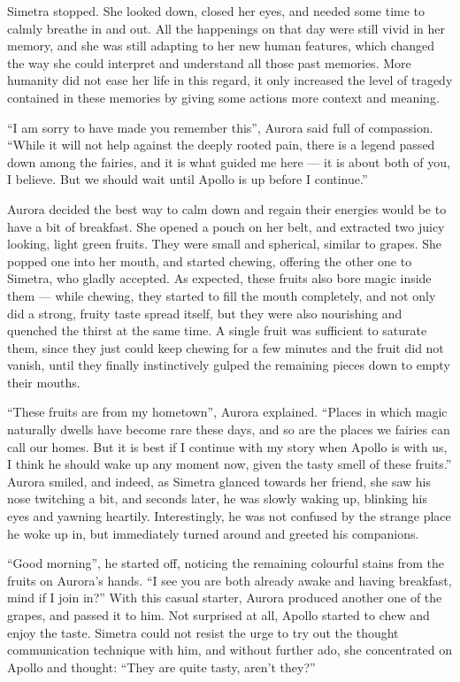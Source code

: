 Simetra stopped. She looked down, closed her eyes, and needed some time to calmly breathe in and out. All the happenings on that day were still vivid in her memory, and she was still adapting to her new human features, which changed the way she could interpret and understand all those past memories. More humanity did not ease her life in this regard, it only increased the level of tragedy contained in these memories by giving some actions more context and meaning.

\enquote{I am sorry to have made you remember this}, Aurora said full of compassion. \enquote{While it will not help against the deeply rooted pain, there is a legend passed down among the fairies, and it is what guided me here --- it is about both of you, I believe. But we should wait until Apollo is up before I continue.}

Aurora decided the best way to calm down and regain their energies would be to have a bit of breakfast. She opened a pouch on her belt, and extracted two juicy looking, light green fruits. They were small and spherical, similar to grapes. She popped one into her mouth, and started chewing, offering the other one to Simetra, who gladly accepted. As expected, these fruits also bore magic inside them --- while chewing, they started to fill the mouth completely, and not only did a strong, fruity taste spread itself, but they were also nourishing and quenched the thirst at the same time. A single fruit was sufficient to saturate them, since they just could keep chewing for a few minutes and the fruit did not vanish, until they finally instinctively gulped the remaining pieces down to empty their mouths.

\enquote{These fruits are from my hometown}, Aurora explained. \enquote{Places in which magic naturally dwells have become rare these days, and so are the places we fairies can call our homes. But it is best if I continue with my story when Apollo is with us, I think he should wake up any moment now, given the tasty smell of these fruits.} Aurora smiled, and indeed, as Simetra glanced towards her friend, she saw his nose twitching a bit, and seconds later, he was slowly waking up, blinking his eyes and yawning heartily. Interestingly, he was not confused by the strange place he woke up in, but immediately turned around and greeted his companions.

\enquote{Good morning}, he started off, noticing the remaining colourful stains from the fruits on Aurora's hands. \enquote{I see you are both already awake and having breakfast, mind if I join in?}
With this casual starter, Aurora produced another one of the grapes, and passed it to him. Not surprised at all, Apollo started to chew and enjoy the taste. Simetra could not resist the urge to try out the thought communication technique with him, and without further ado, she concentrated on Apollo and thought: \enquote{They are quite tasty, aren't they?}

